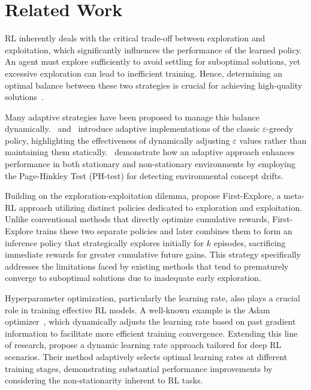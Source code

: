 
\section{Related Work}
\label{sec:related}

\ac{RL} inherently deals with the critical trade-off between exploration and exploitation, which 
significantly influences the performance of the learned policy. An agent must explore sufficiently to 
avoid settling for suboptimal solutions, yet excessive exploration can lead to inefficient training. 
Hence, determining an optimal balance between these two strategies is crucial for achieving 
high-quality solutions~\cite{sutton18}.

Many adaptive strategies have been proposed to manage this balance dynamically.~\citet{tokic2010} 
and~\citet{mignon2017adaptive} introduce adaptive implementations of the classic 
$\varepsilon$-greedy policy, highlighting the effectiveness of dynamically adjusting $\varepsilon$ values 
rather than maintaining them statically.~\citet{mignon2017adaptive} demonstrate how an adaptive 
approach enhances performance in both stationary and non-stationary environments by employing 
the Page-Hinkley Test (PH-test) for detecting environmental concept drifts.

Building on the exploration-exploitation dilemma, \citet{norman2024firstexploreexploitmetalearningsolve} 
propose First-Explore, a meta-\ac{RL} approach utilizing distinct policies dedicated to exploration 
and exploitation. Unlike conventional methods that directly optimize cumulative rewards, First-Explore 
trains these two separate policies and later combines them to form an inference policy that strategically 
explores initially for $k$ episodes, sacrificing immediate rewards for greater cumulative future gains. 
This strategy specifically addresses the limitations faced by existing methods that tend to prematurely 
converge to suboptimal solutions due to inadequate early exploration.

Hyperparameter optimization, particularly the learning rate, also plays a crucial role in training 
effective \ac{RL} models. A well-known example is the Adam 
optimizer~\cite{kingma2017adammethodstochasticoptimization}, which dynamically adjusts the learning 
rate based on past gradient information to facilitate more efficient training convergence. Extending 
this line of research, \citet{dynamicrlalpha} propose a dynamic learning rate approach tailored for deep 
\ac{RL} scenarios. Their method adaptively selects optimal learning rates at different training stages, 
demonstrating substantial performance improvements by considering the non-stationarity inherent to 
\ac{RL} tasks.

